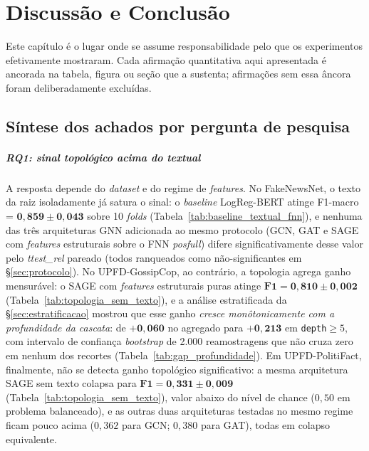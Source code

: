
\chapter{Discuss\~ao e Conclus\~ao}
\label{cap:conclusao}

Este cap\'itulo \'e o lugar onde se assume responsabilidade pelo que os
experimentos efetivamente mostraram. Cada afirma\c{c}\~ao quantitativa
aqui apresentada \'e ancorada na tabela, figura ou se\c{c}\~ao que a
sustenta; afirma\c{c}\~oes sem essa \^ancora foram deliberadamente
exclu\'idas.

\section{S\'intese dos achados por pergunta de pesquisa}
\label{sec:sintese}

\paragraph{RQ1: sinal topol\'ogico acima do textual} A resposta depende do \emph{dataset} e do regime de
\emph{features}. No FakeNewsNet, o texto da raiz isoladamente j\'a satura
o sinal: o \emph{baseline} LogReg-BERT atinge F1-macro =
$\mathbf{0{,}859 \pm 0{,}043}$ sobre 10 \emph{folds}
(Tabela~\ref{tab:baseline_textual_fnn}), e nenhuma das tr\^es
arquiteturas GNN adicionada ao mesmo protocolo (GCN, GAT e SAGE com
\emph{features} estruturais sobre o FNN \emph{posfull}) difere
significativamente desse valor pelo \emph{ttest\_rel} pareado (todos
ranqueados como n\~ao-significantes em \S\ref{sec:protocolo}). No
UPFD-GossipCop, ao contr\'ario, a topologia agrega ganho mensur\'avel: o
SAGE com \emph{features} estruturais puras atinge
$\mathbf{F1 = 0{,}810 \pm 0{,}002}$ (Tabela~\ref{tab:topologia_sem_texto}),
e a an\'alise estratificada da \S\ref{sec:estratificacao} mostrou que
esse ganho \emph{cresce mon\^otonicamente com a profundidade da cascata}:
de $\mathbf{+0{,}060}$ no agregado para $\mathbf{+0{,}213}$ em
\texttt{depth}$\geq 5$, com intervalo de confian\c{c}a \emph{bootstrap}
de 2.000 reamostragens que n\~ao cruza zero em nenhum dos recortes
(Tabela~\ref{tab:gap_profundidade}). Em UPFD-PolitiFact, finalmente, n\~ao
se detecta ganho topol\'ogico significativo: a mesma arquitetura SAGE
sem texto colapsa para $\mathbf{F1 = 0{,}331 \pm 0{,}009}$
(Tabela~\ref{tab:topologia_sem_texto}), valor abaixo do n\'ivel de
chance ($0{,}50$ em problema balanceado), e as outras duas arquiteturas
testadas no mesmo regime ficam pouco acima ($0{,}362$ para GCN; $0{,}380$
para GAT), todas em colapso equivalente.

